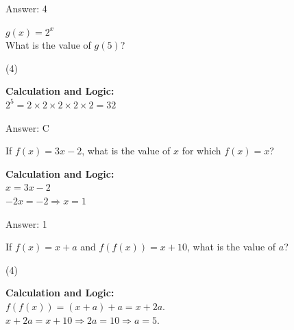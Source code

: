 \documentclass[11pt,paper=a4,answers]{exam}
\begin{document}
\begin{questions}
\begin{solution}
\vspace{30pt}

Answer: \colorbox{yellow!100}{4}
\end{solution}

\vspace{40pt}

\question
$g(x) = 2^x$ \\
What is the value of $g(5)$?
\begin{tasks}(4)
\end{tasks}

\begin{solution}
\textbf{Calculation and Logic:} \\
$2^5 = 2 \times 2 \times 2 \times 2 \times 2 = 32$

\vspace{30pt}

Answer: \colorbox{yellow!100}{C}
\end{solution}

\vspace{40pt}

\question
If $f(x) = 3x - 2$, what is the value of $x$ for which $f(x) = x$?

\begin{solution}
\textbf{Calculation and Logic:} \\
$x = 3x - 2$ \\
$-2x = -2 \Rightarrow x = 1$

\vspace{30pt}

Answer: \colorbox{yellow!100}{1}
\end{solution}

\vspace{40pt}

\question
If $f(x) = x+a$ and $f(f(x)) = x+10$, what is the value of $a$?
\begin{tasks}(4)
\end{tasks}

\begin{solution}
\textbf{Calculation and Logic:} \\
$f(f(x)) = (x+a) + a = x + 2a$. \\
$x + 2a = x + 10 \Rightarrow 2a = 10 \Rightarrow a = 5$.


\end{solution}
\end{questions}
\end{document}
